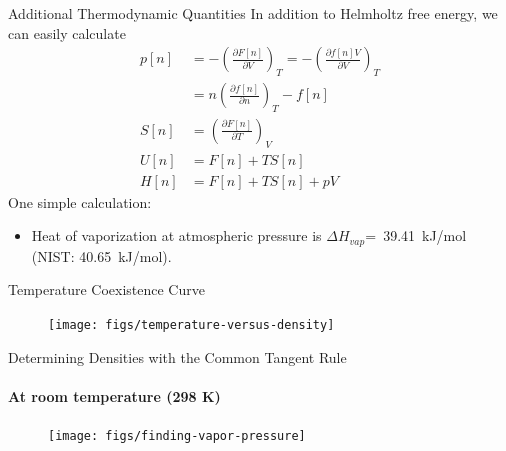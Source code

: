 \documentclass{beamer}
\begin{document}

\begin{frame}[fragile]{Additional Thermodynamic Quantities}
In addition to Helmholtz free energy, we can easily calculate
\begin{align}
  p[n] &= -\left(\frac{\partial F[n]}{\partial V}\right)_{T} 
    = -\left(\frac{\partial f[n]V}{\partial V}\right)_{T} \nonumber \\
  &= n \left(\frac{\partial f[n]}{\partial n}\right)_{T} - f[n] \\
  S[n] &= \left(\frac{\partial F[n]}{\partial T}\right)_{V} \\
  U[n] &= F[n] + TS[n] \\
  H[n] &= F[n] + TS[n] + pV
\end{align}
\pause
One simple calculation: 
\begin{itemize}
 \item Heat of vaporization at atmospheric pressure is
$\Delta H_{vap}$=~39.41~kJ/mol (NIST: 40.65~kJ/mol).
\end{itemize}
\end{frame} 

\begin{frame}[fragile]{Temperature Coexistence Curve}
\begin{figure}
\begin{center}
\texttt{[image: figs/temperature-versus-density]}
\end{center}
\end{figure}
\end{frame}

\begin{frame}[fragile]{Determining Densities with the Common Tangent Rule}
\framesubtitle{At room temperature (298 K)}
\begin{figure}
\begin{center}
\texttt{[image: figs/finding-vapor-pressure]}
\end{center}
\end{figure}
\end{frame}
\end{document}

